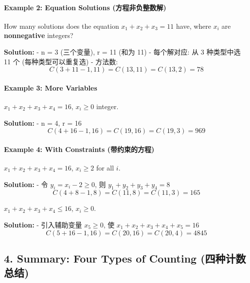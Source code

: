 \documentclass[10pt,a4paper,openany]{ctexbook}
\theoremstyle{definition}
\theoremstyle{remark}
\renewenvironment{quote}
  {\list{}{\leftmargin=1em\rightmargin=0pt\topsep=0.5pt\partopsep=0pt}\item[]}
  {\endlist}
\begin{document}
\paragraph{Example 2: Equation Solutions (方程非负整数解)}

\begin{quote}
How many solutions does the equation $x_1 + x_2 + x_3 = 11$ have, where $x_i$ are \textbf{nonnegative} integers?

\textbf{Solution:}
- n = 3 (三个变量), r = 11 (和为 11)
- 每个解对应: 从 3 种类型中选 11 个 (每种类型可以重复选)
- 方法数:
\[
C(3 + 11 - 1, 11) = C(13, 11) = C(13, 2) = 78
\]


\end{quote}

\paragraph{Example 3: More Variables}

\begin{quote}
$x_1 + x_2 + x_3 + x_4 = 16$, $x_i \ge 0$ integer.

\textbf{Solution:}
- n = 4, r = 16
\[
C(4 + 16 - 1, 16) = C(19, 16) = C(19, 3) = 969
\]


\end{quote}

\paragraph{Example 4: With Constraints (带约束的方程)}

\begin{quote}
$x_1 + x_2 + x_3 + x_4 = 16$, $x_i \ge 2$ for all $i$.

\textbf{Solution:}
- 令 $y_i = x_i - 2 \ge 0$, 则 $y_1 + y_2 + y_3 + y_4 = 8$
\[
C(4 + 8 - 1, 8) = C(11, 8) = C(11, 3) = 165
\]


$x_1 + x_2 + x_3 + x_4 \le 16$, $x_i \ge 0$.

\textbf{Solution:}
- 引入辅助变量 $x_5 \ge 0$, 使 $x_1 + x_2 + x_3 + x_4 + x_5 = 16$
\[
C(5 + 16 - 1, 16) = C(20, 16) = C(20, 4) = 4845
\]


\end{quote}
\vspace{-2pt}

\subsection{4. Summary: Four Types of Counting (四种计数总结)}
\end{document}
